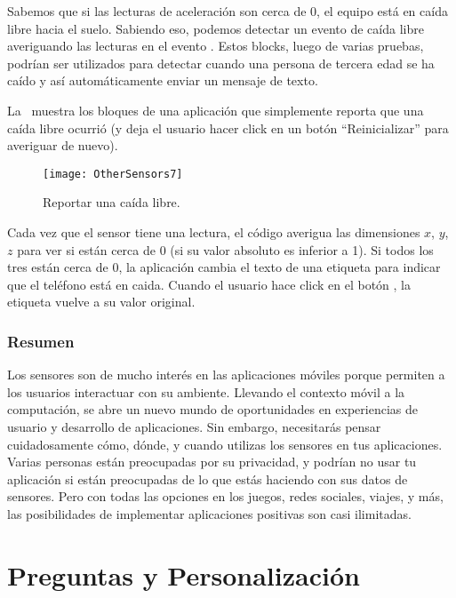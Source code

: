 Sabemos que si las lecturas de aceleración son cerca de 0, el equipo
está en caída libre hacia el suelo. Sabiendo eso, podemos detectar un
evento de caída libre averiguando las lecturas en el evento
. Estos blocks, luego de
varias pruebas, podrían ser utilizados para detectar cuando una
persona de tercera edad se ha caído y así automáticamente enviar un
mensaje de texto.

La~ muestra los bloques de una aplicación que
simplemente reporta que una caída libre ocurrió (y deja el usuario
hacer click en un botón ``Reinicializar'' para averiguar de nuevo).

\begin{figure}[H]
\centering
\texttt{[image: OtherSensors7]}
\caption{Reportar una caída libre.}
\label{fig:OtherSensors7}
\end{figure}

Cada vez que el sensor tiene una lectura, el código averigua las
dimensiones $x$, $y$, $z$ para ver si están cerca de 0 (si su valor
absoluto es inferior a 1). Si todos los tres están cerca de 0, la
aplicación cambia el texto de una etiqueta para indicar que el
teléfono está en caida. Cuando el usuario hace click en el botón
, la etiqueta vuelve a su valor
original.

\subsubsection*{Resumen}

Los sensores son de mucho interés en las aplicaciones móviles porque
permiten a los usuarios interactuar con su ambiente. Llevando el
contexto móvil a la computación, se abre un nuevo mundo de
oportunidades en experiencias de usuario y desarrollo de
aplicaciones. Sin embargo, necesitarás pensar cuidadosamente cómo,
dónde, y cuando utilizas los sensores en tus aplicaciones. Varias
personas están preocupadas por su privacidad, y podrían no usar tu
aplicación si están preocupadas de lo que estás haciendo con sus datos
de sensores. Pero con todas las opciones en los juegos, redes
sociales, viajes, y más, las posibilidades de implementar aplicaciones
positivas son casi ilimitadas.

\section{Preguntas y Personalización}

